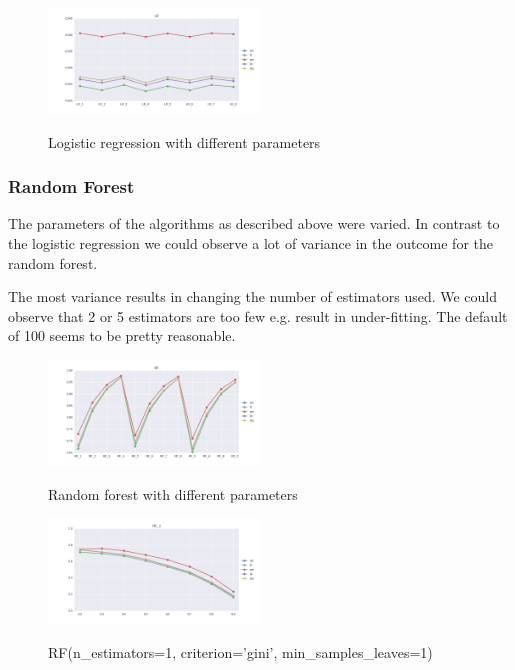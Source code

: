 \documentclass{sig-alternate-05-2015}
\begin{document}
\begin{figure}[h]
  \label{fig:lr}
  \centering
  \caption{Logistic regression with different parameters}
  \includegraphics[width=0.5\textwidth]{../plots/LR_compare_param}
  \label{fig:anomalySetup}
\end{figure}

\subsubsection{Random Forest}
The parameters of the algorithms as described above were varied.
In contrast to the logistic regression we could observe a lot of variance in the outcome for the random forest.

The most variance results in changing the number of estimators used. We could observe that 2 or 5 estimators are too few e.g. result in under-fitting. The default of 100 seems to be pretty reasonable.


\begin{figure}[h]
  \label{fig:lr}
  \centering
  \caption{Random forest with different parameters}
  \includegraphics[width=0.5\textwidth]{../plots/RF_compare_param}
  \label{fig:anomalySetup}
\end{figure}


\begin{figure}[]
  \centering
  \caption{RF(n\_estimators=1, criterion='gini', min\_samples\_leaves=1)}
  \includegraphics[width=0.5\textwidth]{../plots/RF_1}
  \label{fig:anomalySetup}
\end{figure}
\end{document}

